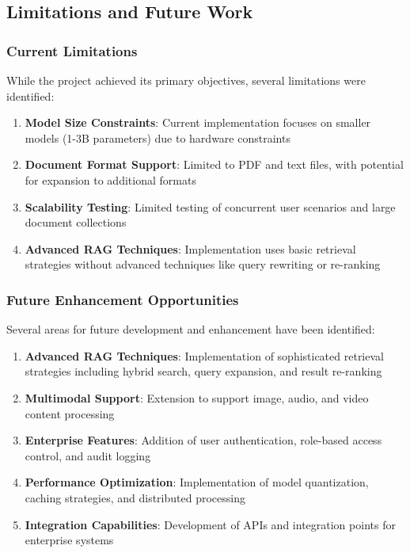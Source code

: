 \documentclass[12pt,letterpaper]{article}
\begin{document}
\subsection{Limitations and Future Work}

\subsubsection{Current Limitations}

While the project achieved its primary objectives, several limitations were identified:

\begin{enumerate}
    \item \textbf{Model Size Constraints}: Current implementation focuses on smaller models (1-3B parameters) due to hardware constraints
    \item \textbf{Document Format Support}: Limited to PDF and text files, with potential for expansion to additional formats
    \item \textbf{Scalability Testing}: Limited testing of concurrent user scenarios and large document collections
    \item \textbf{Advanced RAG Techniques}: Implementation uses basic retrieval strategies without advanced techniques like query rewriting or re-ranking
\end{enumerate}

\subsubsection{Future Enhancement Opportunities}

Several areas for future development and enhancement have been identified:

\begin{enumerate}
    \item \textbf{Advanced RAG Techniques}: Implementation of sophisticated retrieval strategies including hybrid search, query expansion, and result re-ranking
    \item \textbf{Multimodal Support}: Extension to support image, audio, and video content processing
    \item \textbf{Enterprise Features}: Addition of user authentication, role-based access control, and audit logging
    \item \textbf{Performance Optimization}: Implementation of model quantization, caching strategies, and distributed processing
    \item \textbf{Integration Capabilities}: Development of APIs and integration points for enterprise systems
\end{enumerate}
\end{document}
